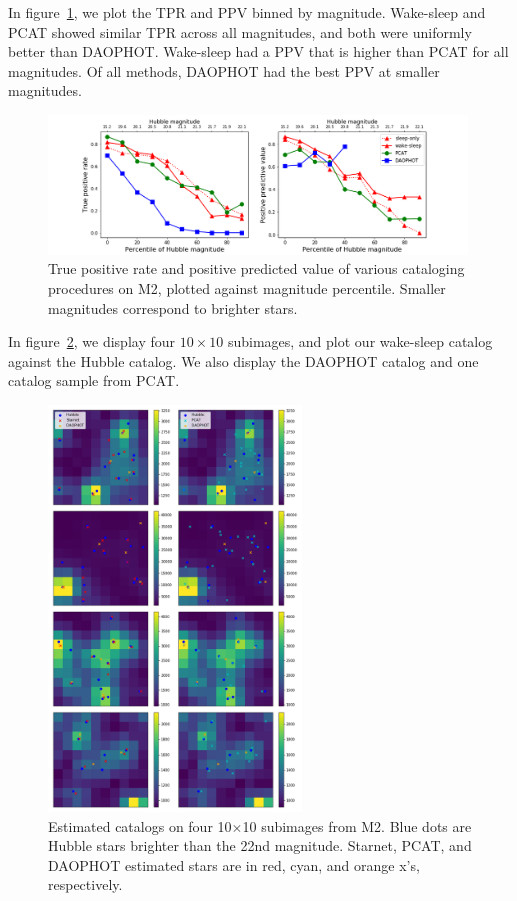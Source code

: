 

In figure~\ref{fig:summary_stats}, we plot the TPR and PPV binned by magnitude.
Wake-sleep and PCAT showed similar TPR across all magnitudes, and both were
uniformly better than DAOPHOT. Wake-sleep had a PPV that is higher than PCAT for all magnitudes. Of all methods, DAOPHOT had the best PPV at smaller magnitudes.

\begin{figure}[h]
    \centering
    \includegraphics[width=0.99\textwidth]{figures/summary_statistics_m2.png}
    \caption{True positive rate and positive predicted value of various cataloging
    procedures on M2, plotted against magnitude percentile.
    Smaller magnitudes correspond to brighter stars. }
    \label{fig:summary_stats}
\end{figure}

In figure~\ref{fig:example_subimages}, we display four $10\times10$ subimages, and plot
our wake-sleep catalog against the Hubble catalog. We also display the DAOPHOT catalog and one catalog sample from PCAT.

\begin{figure}[h]
    \centering
    \includegraphics[width=0.6\textwidth]{figures/example_subimages.png}
    \caption{Estimated catalogs on four 10$\times$10 subimages from
    M2. Blue dots are Hubble stars brighter than the 22nd magnitude.
    Starnet, PCAT, and DAOPHOT estimated stars are in
    red, cyan, and orange x's, respectively. }
    \label{fig:example_subimages}
\end{figure}


